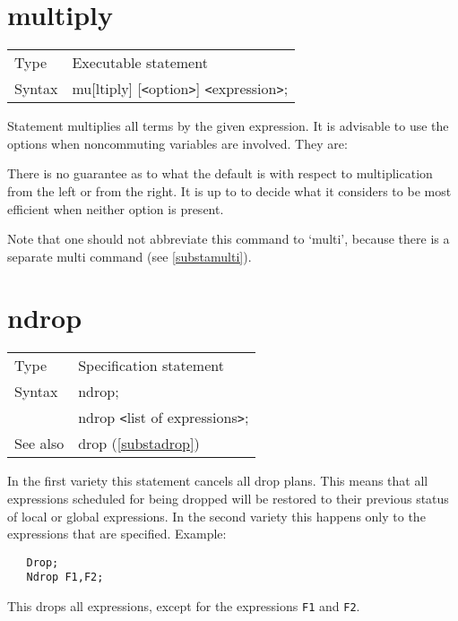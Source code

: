  
\section{multiply}
\label{substamultiply}

\noindent \begin{tabular}{ll}
Type & Executable statement\\
Syntax & mu[ltiply] [{\tt<}option{\tt>}] {\tt<}expression{\tt>};
\end{tabular} \vspace{4mm}

\noindent Statement multiplies all terms by the given 
expression. It is advisable to use the options when noncommuting variables 
are involved. They are:\vspace{1mm}



\noindent There is no guarantee as to what the default is 
with respect to multiplication from the left or from the right. It is up to 
{\FORM} to decide what it considers to be most efficient when neither 
option is present. \vspace{4mm}

\noindent Note that one should not abbreviate this command to `multi', 
because there is a separate multi command (see 
\ref{substamulti}). \vspace{10mm}


\section{ndrop}
\label{substandrop}

\noindent \begin{tabular}{ll}
Type & Specification statement\\
Syntax & ndrop; \\
       & ndrop {\tt<}list of expressions{\tt>};
\\ See also & drop (\ref{substadrop})
\end{tabular} \vspace{4mm}

In the first variety this statement cancels all 
drop plans. This means that all expressions scheduled for being 
dropped will be restored to their previous status of local or global 
expressions. In the second variety this happens only to the expressions 
that are specified. Example:
\begin{verbatim}
   Drop;
   Ndrop F1,F2;
\end{verbatim}
This drops all expressions, except for the expressions \verb:F1: and 
\verb:F2:. \vspace{10mm}

